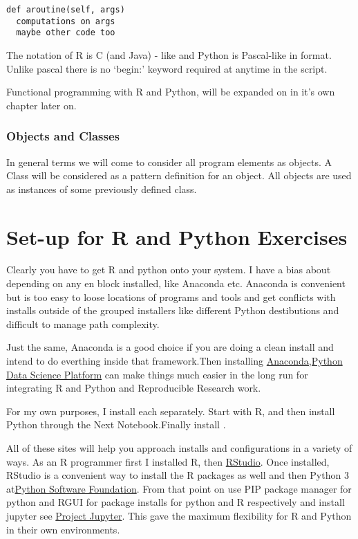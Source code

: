 \documentclass[]{book}
\theoremstyle{definition}
\theoremstyle{definition}
\theoremstyle{definition}
\theoremstyle{remark}
\begin{document}
\begin{verbatim}
def aroutine(self, args)
  computations on args
  maybe other code too
\end{verbatim}

The notation of R is C (and Java) - like and Python is Pascal-like in
format. Unlike pascal there is no `begin:' keyword required at anytime
in the script.

Functional programming with R and Python, will be expanded on in it's
own chapter later on.

\subsection{Objects and Classes}\label{objects-and-classes}

In general terms we will come to consider all program elements as
objects. A Class will be considered as a pattern definition for an
object. All objects are used as instances of some previously defined
class.

\chapter{Set-up for R and Python
Exercises}\label{set-up-for-r-and-python-exercises}

Clearly you have to get R and python onto your system. I have a bias
about depending on any en block installed, like Anaconda etc. Anaconda
is convenient but is too easy to loose locations of programs and tools
and get conflicts with installs outside of the grouped installers like
different Python destibutions and difficult to manage path complexity.

Just the same, Anaconda is a good choice if you are doing a clean
install and intend to do everthing inside that framework.Then installing
\href{https://www.anaconda.com/}{Anaconda,Python Data Science Platform}
can make things much easier in the long run for integrating R and Python
and Reproducible Research work.

For my own purposes, I install each separately. Start with R, and then
install Python through the Next Notebook.Finally install .

All of these sites will help you approach installs and configurations in
a variety of ways. As an R programmer first I installed R, then
\href{https://www.rstudio.com/}{RStudio}. Once installed, RStudio is a
convenient way to install the R packages as well and then Python 3
at\href{https://www.python.org/}{Python Software Foundation}. From that
point on use PIP package manager for python and RGUI for package
installs for python and R respectively and install jupyter see
\href{http://jupyter.org/install}{Project Jupyter}. This gave the
maximum flexibility for R and Python in their own environments.
\end{document}
